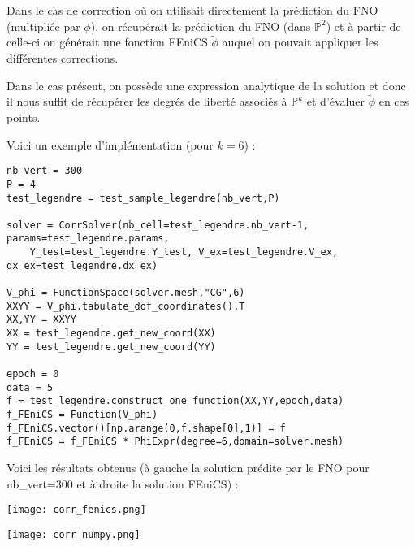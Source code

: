 Dans le cas de correction où on utilisait directement la prédiction du FNO (multipliée par $\phi$), on récupérait la prédiction du FNO (dans $\mathbb{P}^2$) et à partir de celle-ci on générait une fonction FEniCS $\tilde{\phi}$ auquel on pouvait appliquer les différentes corrections. 

Dans le cas présent, on possède une expression analytique de la solution et donc il nous suffit de récupérer les degrés de liberté associés à $\mathbb{P}^k$ et d'évaluer $\tilde{\phi}$ en ces points.

Voici un exemple d'implémentation (pour $k=6$) :
\begin{lstlisting}
nb_vert = 300
P = 4
test_legendre = test_sample_legendre(nb_vert,P)

solver = CorrSolver(nb_cell=test_legendre.nb_vert-1, params=test_legendre.params, 
	Y_test=test_legendre.Y_test, V_ex=test_legendre.V_ex, dx_ex=test_legendre.dx_ex)

V_phi = FunctionSpace(solver.mesh,"CG",6)
XXYY = V_phi.tabulate_dof_coordinates().T
XX,YY = XXYY
XX = test_legendre.get_new_coord(XX)
YY = test_legendre.get_new_coord(YY)

epoch = 0
data = 5
f = test_legendre.construct_one_function(XX,YY,epoch,data)
f_FEniCS = Function(V_phi)
f_FEniCS.vector()[np.arange(0,f.shape[0],1)] = f
f_FEniCS = f_FEniCS * PhiExpr(degree=6,domain=solver.mesh)
\end{lstlisting}

\newpage

Voici les résultats obtenus (à gauche la solution prédite par le FNO pour nb\_vert=300 et à droite la solution FEniCS) :

\begin{minipage}{0.48\linewidth}
	\centering
	\texttt{[image: corr\_fenics.png]}
\end{minipage}
\begin{minipage}{0.48\linewidth}
	\centering
	\texttt{[image: corr\_numpy.png]}
\end{minipage}

